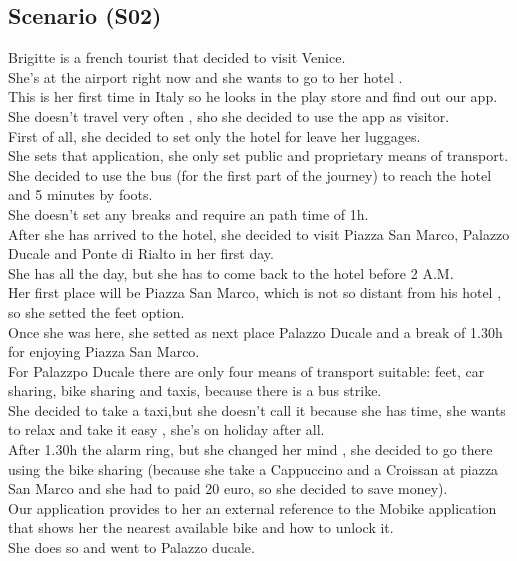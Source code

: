 \documentclass[a4paper]{book}
\begin{document}
\subsection{Scenario (S02) }
Brigitte is a french tourist that decided to visit Venice.\\
She's at the airport right now and she wants to go to her hotel .\\
This is her first time in Italy so he looks in the play store and find out our app.\\
She doesn't travel very often , sho she decided to use the app as visitor.\\
First of all, she decided to set only the hotel for leave her luggages.\\
She sets that application, she only set public and proprietary means of transport.\\
She decided to use the bus (for the first part of the journey) to reach the hotel and 5 minutes by foots.\\
She doesn't set any breaks and require an path time of 1h.\\
After she has arrived to the hotel, she decided to visit Piazza San Marco, Palazzo Ducale and Ponte di Rialto in her first day.\\
She has all the day, but she has to come back to the hotel before 2 A.M.\\
Her first place will be Piazza San Marco, which is not so distant from his hotel , so she setted the feet option.\\
Once she was here, she setted as next place Palazzo Ducale  and a break of 1.30h for enjoying Piazza San Marco.\\
For Palazzpo Ducale there are only four means of transport suitable: feet, car sharing, bike sharing and taxis, because there is a bus strike.\\
She decided to take a taxi,but she doesn't call it because she has time,  she wants to relax and take it easy , she's on holiday after all.\\
After 1.30h the alarm ring, but she changed her mind , she decided to go there using the bike sharing (because she take a Cappuccino and a Croissan at piazza San Marco and she had to paid 20 euro, so she decided to save money).\\
Our application provides to her an external reference to the Mobike application that shows her the nearest available bike and how to unlock it.\\
She does so  and went to Palazzo ducale.\\
\end{document}
